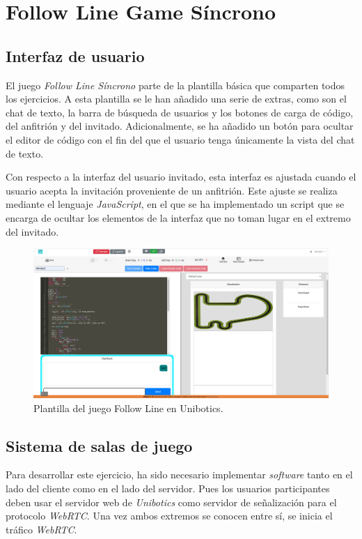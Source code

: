 \documentclass[a4paper, 12pt]{book}
\begin{document}
\section{Follow Line Game Síncrono} 
\label{sec:follow_line_game_sync}

\subsection{Interfaz de usuario}

El juego \emph{Follow Line Síncrono} parte de la plantilla básica que comparten todos los ejercicios. A esta plantilla se le han añadido una serie de extras, como son el chat de texto, la barra de búsqueda de usuarios y los botones de carga de código, del anfitrión y del invitado. Adicionalmente, se ha añadido un botón para ocultar el editor de código con el fin del que el usuario tenga únicamente la vista del chat de texto.

Con respecto a la interfaz del usuario invitado, esta interfaz es ajustada cuando el usuario acepta la invitación proveniente de un anfitrión. Este ajuste se realiza mediante el lenguaje \emph{JavaScript}, en el que se ha implementado un script que se encarga de ocultar los elementos de la interfaz que no toman lugar en el extremo del invitado.
\begin{figure}[H]
	\centering
    \includegraphics[width=15cm]{img/follow_line_game_sync.png}
    \caption{Plantilla del juego Follow Line en Unibotics.}
    \label{figura:diagrama_conexion_webrtc}
\end{figure}

\subsection{Sistema de salas de juego}

Para desarrollar este ejercicio, ha sido necesario implementar \emph{software} tanto en el lado del cliente como en el lado del servidor. Pues los usuarios participantes deben usar el servidor web de \emph{Unibotics} como servidor de señalización para el protocolo \emph{WebRTC}. Una vez ambos extremos se conocen entre sí, se inicia el tráfico \emph{WebRTC}.
\end{document}
